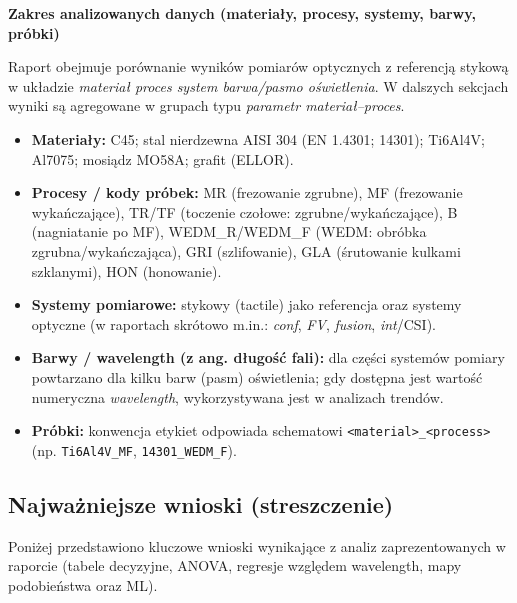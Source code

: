 \documentclass[
  10pt,
]{article}
\begin{document}
\noindent\textbf{Zakres analizowanych danych (materiały, procesy, systemy, barwy, próbki)}\par
\vspace{2mm}
\noindent Raport obejmuje porównanie wyników pomiarów optycznych z referencją stykową w układzie \emph{materiał \texttimes{} proces \texttimes{} system \texttimes{} barwa/pasmo oświetlenia}. W dalszych sekcjach wyniki są agregowane w grupach typu \emph{parametr \texttimes{} materiał--proces}.\par
\vspace{1mm}
\begin{itemize}
  \item \textbf{Materiały:} C45; stal nierdzewna AISI 304 (EN 1.4301; 14301); Ti6Al4V; Al7075; mosiądz MO58A; grafit (ELLOR).
  \item \textbf{Procesy / kody próbek:} MR (frezowanie zgrubne), MF (frezowanie wykańczające), TR/TF (toczenie czołowe: zgrubne/wykańczające), B (nagniatanie po MF), WEDM\_R/WEDM\_F (WEDM: obróbka zgrubna/wykańczająca), GRI (szlifowanie), GLA (śrutowanie kulkami szklanymi), HON (honowanie).
  \item \textbf{Systemy pomiarowe:} stykowy (tactile) jako referencja oraz systemy optyczne (w raportach skrótowo m.in.: \textit{conf}, \textit{FV}, \textit{fusion}, \textit{int}/CSI).
  \item \textbf{Barwy / wavelength (z ang. długość fali):} dla części systemów pomiary powtarzano dla kilku barw (pasm) oświetlenia; gdy dostępna jest wartość numeryczna \emph{wavelength}, wykorzystywana jest w analizach trendów.
  \item \textbf{Próbki:} konwencja etykiet odpowiada schematowi \texttt{<material>\_<process>} (np. \texttt{Ti6Al4V\_MF}, \texttt{14301\_WEDM\_F}).
\end{itemize}
\clearpage

\setcounter{tocdepth}{2}
\tableofcontents
\newpage
\listoffigures
\newpage
{}

\subsection{Najważniejsze wnioski
(streszczenie)}\label{najwaux17cniejsze-wnioski-streszczenie}

Poniżej przedstawiono kluczowe wnioski wynikające z analiz
zaprezentowanych w raporcie (tabele decyzyjne, ANOVA, regresje względem
wavelength, mapy podobieństwa oraz ML).
\end{document}

